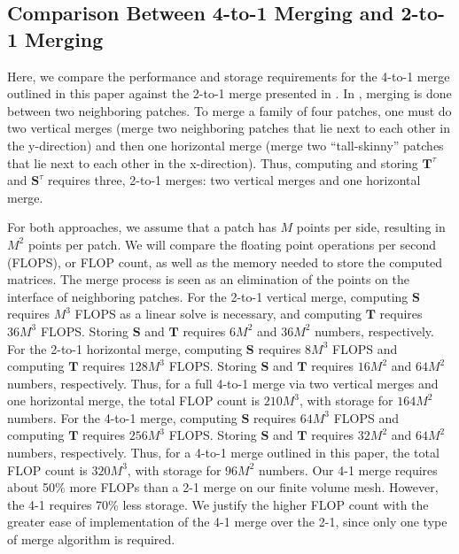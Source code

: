 \subsection{Comparison Between 4-to-1 Merging and 2-to-1 Merging}
\label{sub:comparison_between_4t1_and2t1_merging}

Here, we compare the performance and storage requirements for the 4-to-1 merge outlined in this paper against the 2-to-1 merge presented in \citep{gillman2014direct}. In \citep{gillman2014direct}, merging is done between two neighboring patches. To merge a family of four patches, one must do two vertical merges (merge two neighboring patches that lie next to each other in the y-direction) and then one horizontal merge (merge two ``tall-skinny'' patches that lie next to each other in the x-direction). Thus, computing and storing $\textbf{T}^{\tau}$ and $\mathbf{S}^{\tau}$ requires three, 2-to-1 merges: two vertical merges and one horizontal merge.

For both approaches, we assume that a patch has $M$ points per side, resulting in $M^2$ points per patch. We will compare the floating point operations per second (FLOPS), or FLOP count, as well as the memory needed to store the computed matrices. The merge process is seen as an elimination of the points on the interface of neighboring patches. For the 2-to-1 vertical merge, computing $\mathbf{S}$ requires $M^3$ FLOPS as a linear solve is necessary, and computing $\mathbf{T}$ requires $36M^3$ FLOPS. Storing $\mathbf{S}$ and $\mathbf{T}$ requires $6M^2$ and $36M^2$ numbers, respectively. For the 2-to-1 horizontal merge, computing $\mathbf{S}$ requires $8M^3$ FLOPS and computing $\mathbf{T}$ requires $128M^3$ FLOPS. Storing $\mathbf{S}$ and $\mathbf{T}$ requires $16M^2$ and $64M^2$ numbers, respectively. Thus, for a full 4-to-1 merge via two vertical merges and one horizontal merge, the total FLOP count is $210M^3$, with storage for $164M^2$ numbers. For the 4-to-1 merge, computing $\mathbf{S}$ requires $64M^3$ FLOPS and computing $\mathbf{T}$ requires $256M^3$ FLOPS. Storing $\mathbf{S}$ and $\mathbf{T}$ requires $32M^2$ and $64M^2$ numbers, respectively. Thus, for a 4-to-1 merge outlined in this paper, the total FLOP count is $320M^3$, with storage for $96M^2$ numbers.  Our 4-1 merge requires about 50\% more FLOPs  than a 2-1 merge on our finite volume mesh.  However, the 4-1 requires 70\% less storage.  We justify the higher FLOP count with the greater ease of implementation of the 4-1 merge over the 2-1, since only one type of merge algorithm is required.  


